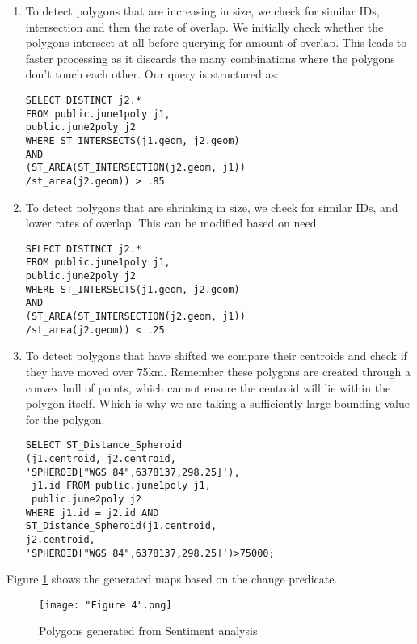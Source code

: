 \documentclass[conference]{IEEEtran}
\begin{document}
\begin{enumerate}
	\item To detect polygons that are increasing in size, we check for similar IDs, intersection and then the rate of overlap. We initially check whether the polygons intersect at all before querying for amount of overlap. This leads to faster processing as it discards the many combinations where the polygons don't touch each other. Our query is structured as:
\begin{lstlisting}
SELECT DISTINCT j2.* 
FROM public.june1poly j1,
public.june2poly j2 
WHERE ST_INTERSECTS(j1.geom, j2.geom)
AND  
(ST_AREA(ST_INTERSECTION(j2.geom, j1))
/st_area(j2.geom)) > .85
\end{lstlisting}

	\item To detect polygons that are shrinking  in size, we check for similar IDs, and lower rates of overlap. This can be modified based on need.
\begin{lstlisting}
SELECT DISTINCT j2.* 
FROM public.june1poly j1,
public.june2poly j2 
WHERE ST_INTERSECTS(j1.geom, j2.geom)
AND  
(ST_AREA(ST_INTERSECTION(j2.geom, j1))
/st_area(j2.geom)) < .25
\end{lstlisting}	

	\item To detect polygons that have shifted we compare their centroids and check if they have moved over 75km. Remember these polygons are created through a convex hull of points, which cannot ensure the centroid will lie within the polygon itself. Which is why we are taking a sufficiently large bounding value for the polygon.
\begin{lstlisting}
SELECT ST_Distance_Spheroid
(j1.centroid, j2.centroid, 
'SPHEROID["WGS 84",6378137,298.25]'), 
 j1.id FROM public.june1poly j1, 
 public.june2poly j2 
WHERE j1.id = j2.id AND 
ST_Distance_Spheroid(j1.centroid, 
j2.centroid, 
'SPHEROID["WGS 84",6378137,298.25]')>75000;
\end{lstlisting}	

\end{enumerate}

Figure \ref{Figure 5} shows the generated maps based on the change predicate.

\begin{figure}[ht]
\centerline{\texttt{[image: "Figure 4".png]}}
\caption{Polygons generated from Sentiment analysis}
\label{Figure 5}
\end{figure}
\end{document}
